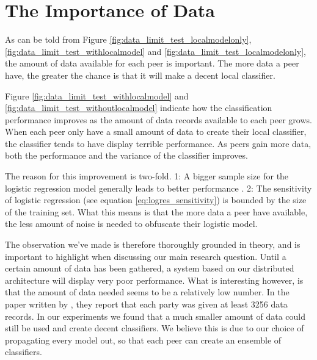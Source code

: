 \section{The Importance of Data} \label{importance_of_data}
As can be told from Figure \ref{fig:data_limit_test_localmodelonly}, \ref{fig:data_limit_test_withlocalmodel} and \ref{fig:data_limit_test_localmodelonly}, the amount of data available for each peer is important. The more data a peer have, the greater the chance is that it will make a decent local classifier. 



Figure \ref{fig:data_limit_test_withlocalmodel} and \ref{fig:data_limit_test_withoutlocalmodel} indicate how the classification performance improves as the amount of data records available to each peer grows. When each peer only have a small amount of data to create their local classifier, the classifier tends to have display terrible performance. As peers gain more data, both the performance and the variance of the classifier improves.     

The reason for this improvement is two-fold. 1: A bigger sample size for the logistic regression model generally leads to better performance \cite{peduzzi1996simulation}. 2: The sensitivity of logistic regression (see equation \ref{eq:logres_sensitivity}) is bounded by the size of the training set. What this means is that the more data a peer have available, the less amount of noise is needed to obfuscate their logistic model. 

The observation we've made is therefore thoroughly grounded in theory, and is important to highlight when discussing our main research question. Until a certain amount of data has been gathered, a system based on our distributed architecture will display very poor performance. What is interesting however, is that the amount of data needed seems to be a relatively low number. In the paper written by \cite{pathak2010diffprivhomo}, they report that each party was given at least 3256 data records. In our experiments we found that a much smaller amount of data could still be used and create decent classifiers. We believe this is due to our choice of propagating every model out, so that each peer can create an ensemble of classifiers.   	  	


